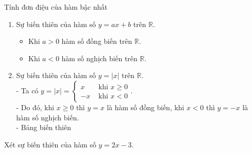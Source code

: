 \begin{dang}{Tính đơn điệu của hàm bậc nhất}
	\begin{enumerate}
		\item Sự biến thiên của hàm số $y=ax+b$ trên $\mathbb{R}$. 
		\begin{itemize}
			\item Khi $a>0$ hàm số đồng biến trên $\mathbb{R}$.
			\begin{center}
			\end{center}
			\item Khi $a<0$ hàm số nghịch biến trên $\mathbb{R}$.
			\begin{center}
			\end{center}
		\end{itemize}
		\item Sự biến thiên của hàm số $y=|x|$ trên $\mathbb{R}$.\\
		- Ta có $y=|x|=\left\{\begin{aligned}x &\mbox{ khi } x\ge 0\\ -x &\mbox{ khi } x< 0\end{aligned}\right.$.\\
		- Do đó, khi $x\ge 0$ thì $y=x$ là hàm số đồng biến, khi $x<0$ thì $y=-x$ là hàm số nghịch biến.\\
		- Bảng biến thiên
		\begin{center}
		\end{center}
	\end{enumerate}
\end{dang}

\begin{vd}%
	Xét sự biến thiên của hàm số $y=2x-3$.
\end{vd}

